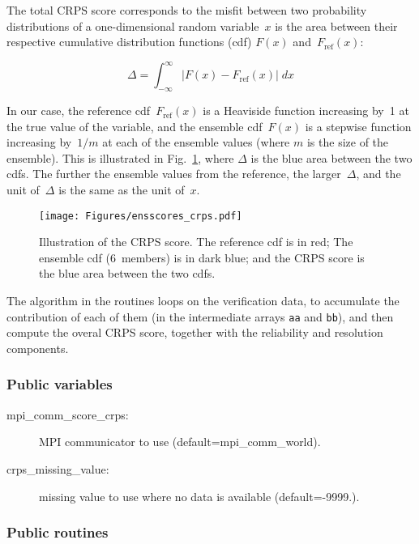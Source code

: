 \documentclass[11pt]{article}
\begin{document}
The total CRPS score corresponds to the misfit between two probability distributions
of a one-dimensional random variable~$x$ is the area
between their respective cumulative distribution functions (cdf)
$F(x)$ and~$F_{\mbox{ref}}(x)$:

\begin{equation}
\label{eq:crps}
\Delta = \int_{-\infty}^{\infty}
\left| F(x) - F_{\mbox{ref}}(x) \right| \; dx
\end{equation}

\noindent
In our case, the reference cdf~$F_{\mbox{ref}}(x)$
is a Heaviside function increasing by~1
at the true value of the variable,
and the ensemble cdf~$F(x)$ is a stepwise function
increasing by~$1/m$ at each of the ensemble values
(where $m$ is the size of the ensemble).
This is illustrated in Fig.~\ref{fig:crps},
where $\Delta$ is the blue area between the two cdfs.
The further the ensemble values from the reference,
the larger~$\Delta$, and the unit of~$\Delta$
is the same as the unit of~$x$.

\begin{figure}[htbp]
\centerline{
\texttt{[image: Figures/ensscores\_crps.pdf]}
}
\caption{Illustration of the CRPS score.
The reference cdf is in red;
The ensemble cdf (6~members) is in dark blue;
and the CRPS score is the blue area between the two cdfs.
\label{fig:crps}}
\end{figure}

The algorithm in the routines loops on the verification data,
to accumulate the contribution of each of them
(in the intermediate arrays {\tt aa} and {\tt bb}),
and then compute the overal CRPS score,
together with the reliability and resolution components.

\subsubsection*{Public variables}

\begin{description}
\item[mpi\_comm\_score\_crps:] MPI communicator to use (default=mpi\_comm\_world).
\item[crps\_missing\_value:] missing value to use where no data is available (default=-9999.).
\end{description}

\subsubsection*{Public routines}
\end{document}
